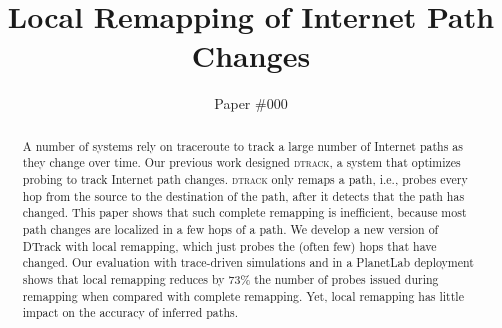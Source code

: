 \documentclass[10pt, letter]{sig-alternate-10pt}
\title{Local Remapping of Internet Path Changes}
\author{Paper \#000\vspace{2cm}}
\newcommand{\dtrack}{\textsc{dtrack}}
\begin{document}
\maketitle


\begin{abstract}
%
A number of systems rely on traceroute to track a large number
of Internet paths as they change over time.  Our previous work designed
\dtrack{}, a system that optimizes probing to track Internet path
changes.  \dtrack{} only remaps a path, i.e., probes every hop from the
source to the destination of the path, after it detects that the path
has changed.  This paper shows that such complete remapping is
inefficient, because most path changes are localized in a few hops of a
path.  We develop a new version of DTrack with local remapping, which
just probes the (often few) hops that have changed.  Our evaluation with
trace-driven simulations and in a PlanetLab deployment shows that local
remapping reduces by 73\% the number of probes issued during remapping
when compared with complete remapping.  Yet, local remapping has little
impact on the accuracy of inferred paths.
%
\end{abstract}





















\end{document}
